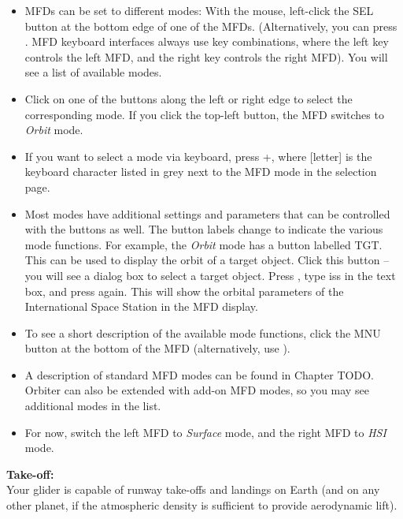 \documentclass[Orbiter User Manual.tex]{subfiles}
\begin{document}
\begin{itemize}
\item MFDs can be set to different modes: With the mouse, left-click the SEL button at the bottom edge of one of the MFDs. (Alternatively, you can press \Shift{}. MFD keyboard interfaces always use \Shift key combinations, where the left \Shift key controls the left MFD, and the right \Shift key controls the right MFD). You will see a list of available modes.
\item Click on one of the buttons along the left or right edge to select the corresponding mode. If you click the top-left button, the MFD switches to \textit{Orbit} mode.
\item If you want to select a mode via keyboard, press \Shift{}+\Shift[letter], where [letter] is the keyboard character listed in grey next to the MFD mode in the selection page.
\item Most modes have additional settings and parameters that can be controlled with the buttons as well. The button labels change to indicate the various mode functions. For example, the \textit{Orbit} mode has a button labelled TGT. This can be used to display the orbit of a target object. Click this button – you will see a dialog box to select a target object. Press \Enter, type iss in the text box, and press \Enter again. This will show the orbital parameters of the International Space Station in the MFD display.
\item To see a short description of the available mode functions, click the MNU button at the bottom of the MFD (alternatively, use \Shift{}).
\item A description of standard MFD modes can be found in Chapter TODO. Orbiter can also be extended with add-on MFD modes, so you may see additional modes in the list.
\item For now, switch the left MFD to \textit{Surface} mode, and the right MFD to \textit{HSI} mode.
\end{itemize}

\noindent
\begin{figure}[H]
	\centering
\end{figure}

\noindent
\textbf{Take-off:}\\
Your glider is capable of runway take-offs and landings on Earth (and on any other planet, if the atmospheric density is sufficient to provide aerodynamic lift).
\end{document}
